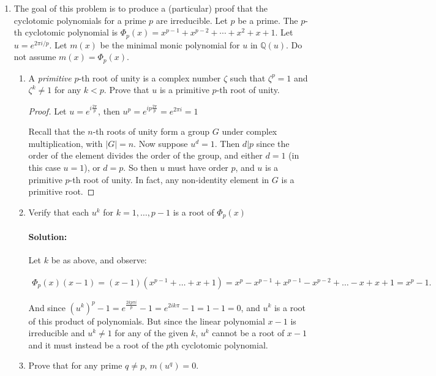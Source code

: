 \documentclass{article}
\begin{document}
    \begin{enumerate}
\item The goal of this problem is to produce a (particular) proof that the cyclotomic polynomials for a prime $p$ are irreducible.   Let $p$ be a prime.  The $p$-th cyclotomic polynomial is $\Phi_p(x)=x^{p-1}+x^{p-2}+\cdots +x^2+x+1$.  Let $u=e^{2\pi i/p}$.  Let $m(x)$ be the minimal monic polynomial for $u$ in ${\mathbb Q}(u)$.  Do not assume $m(x)=\Phi_p(x)$.

\begin{enumerate}
\item A {\it primitive} $p$-th root of unity is a complex number $\zeta$ such that $\zeta^p=1$ and $\zeta^k\neq 1$ for any $k<p$.  Prove that $u$ is a primitive $p$-th root of unity.
    \begin{proof} 
        Let $u=e^{i \frac{2\pi}{p}}$, then $u^{p}=e^{ip \frac{2\pi}{p}}=e^{2\pi i}=1$

        Recall that the $n$-th roots of unity form a group $G$ under complex multiplication, with $|G|=n$.
        Now suppose $u^{d}=1$. Then $d|p$ since the order of the element divides the order of the group,
        and either $d=1$ (in this case $u=1$), or $d=p$. So then $u$ must have order $p$, and $u$
        is a primitive $p$-th root of unity. In fact, any non-identity element in $G$ is a primitive root.
    \end{proof}
\item Verify that each $u^k$ for $k=1, \ldots , p-1$ is a root of $\Phi_p(x)$
    \paragraph{Solution:} Let $k$ be as above, and observe:

    \begin{align*}
        \Phi_p(x)(x-1)=(x-1)(x^{p-1}+\ldots+x+1)=x^{p}-x^{p-1}+x^{p-1}-x^{p-2}+\ldots-x+x+1=x^{p}-1
    .\end{align*}

    And since $(u^{k})^{p}-1=e^{\frac{2kp\pi i}{p}}-1=e^{2ik\pi}-1=1-1=0$, and $u^{k}$ is a root of this 
    product of polynomials. But since the linear polynomial $x-1$ is irreducible and $u^k\neq 1$ 
    for any of the given $k$, $u^{k}$ cannot be a root of $x-1$ and it must instead be a root of the 
    $p$th cyclotomic polynomial.

\item Prove that for any prime $q\neq p$, $m(u^q)=0$.


\end{enumerate}
\end{enumerate}
\end{document}
